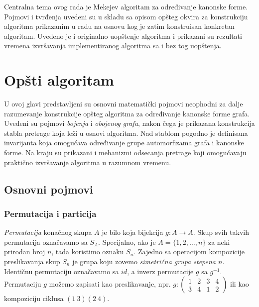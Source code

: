 \documentclass[12pt,oneside]{memoir}
\theoremstyle{definition}
\begin{document}
 Centralna tema ovog rada je Mekejev algoritam za određivanje kanonske forme.
 Pojmovi i tvrđenja uvedeni su u skladu sa opisom opšteg okvira za konstrukciju
 algoritma prikazanim u radu \cite{McKay} na osnovu kog je zatim konstruisan
 konkretan algoritam. Uvedeno je i originalno uopštenje algoritma i prikazani
 su rezultati vremena izvršavanja implementiranog algoritma sa i bez tog
 uopštenja.

\chapter{Opšti algoritam}

 U ovoj glavi predstavljeni su osnovni matematički pojmovi neophodni za dalje
 razumevanje konstrukcije opšteg algoritma za određivanje kanonske forme grafa.
 Uvedeni su pojmovi \emph{bojenja} i \emph{obojenog grafa}, nakon čega je
 prikazana konstrukcija stabla pretrage koja leži u osnovi algoritma. Nad
 stablom pogodno je definisana invarijanta koja omogućava određivanje grupe
 automorfizama grafa i kanonske forme. Na kraju su prikazani i mehanizmi
 odsecanja pretrage koji omogućavaju praktično izvršavanje algoritma u razumnom
 vremenu.

 \section{Osnovni pojmovi}

  \subsection{Permutacija i particija}

   \emph{Permutacija} konačnog skupa $A$ je bilo koja bijekcija $g : A \to A$.
   Skup svih takvih permutacija označavamo sa $S_A$. Specijalno, ako je $A =
   \{1, 2, \dots, n\}$ za neki prirodan broj $n$, tada koristimo oznaku $S_n$.
   Zajedno sa operacijom kompozicije preslikavanja skup $S_n$ je grupa koju
   zovemo \emph{simetrična grupa stepena $n$}. Identičnu permutaciju označavamo
   sa $id$, a inverz permutacije $g$ sa $g^{-1}$. Permutaciju $g$ možemo
   zapisati kao preslikavanje, npr.  $g : \begin{pmatrix} 1 & 2 & 3 & 4\\ 3
   & 4 & 1 & 2 \end{pmatrix}$ ili kao kompoziciju ciklusa $(1\ 3)(2\ 4)$.
\end{document}
